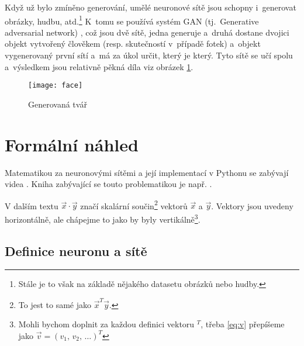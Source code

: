 \documentclass[12pt]{report}			%
\begin{document}
					Když už bylo zmíněno generování, umělé neuronové sítě jsou schopny i~generovat obrázky, hudbu, atd.\footnote{Stále je to však na základě nějakého datasetu obrázků nebo hudby.} K~tomu se používá systém GAN (tj.~Generative adversarial network) \autocite{art:GAN}, což jsou dvě sítě, jedna generuje a~druhá dostane dvojici objekt vytvořený člověkem (resp. skutečností v~případě fotek) a~objekt vygenerovaný první sítí a~má za úkol určit, který je který. Tyto sítě se učí spolu a~výsledkem jsou relativně pěkná díla viz obrázek \ref{fig:face}.
					
					\begin{figure}
						\centering
						\texttt{[image: face]}
						\caption{Generovaná tvář \autocite{online:Face}}
						\label{fig:face}
					\end{figure}
			
			
			\chapter{Formální náhled} \label{s:fn}
			
				Matematikou za neuronovými sítěmi a její implementací v Pythonu se zabývají videa \autocite{vid:NN}. Kniha zabývající se touto problematikou je např. \autocite{book:NN}.
				
				V dalším textu $\vec{x}\cdot\vec{y}$ značí skalární součin\footnote{To jest to samé jako $\vec{x}^T\vec{y}$.} vektorů $\vec{x}$ a $\vec{y}$. Vektory jsou uvedeny horizontálně, ale chápejme to jako by byly vertikálně\footnote{Mohli bychom doplnit za každou definici vektoru $^T$, třeba \ref{eq:v} přepíšeme jako $\vec{v} = \left(v_{1},\,v_{2},\,\ldots\right)^T$}.

				\section{Definice neuronu a sítě} \label{s:neuron}
					
\end{document}
